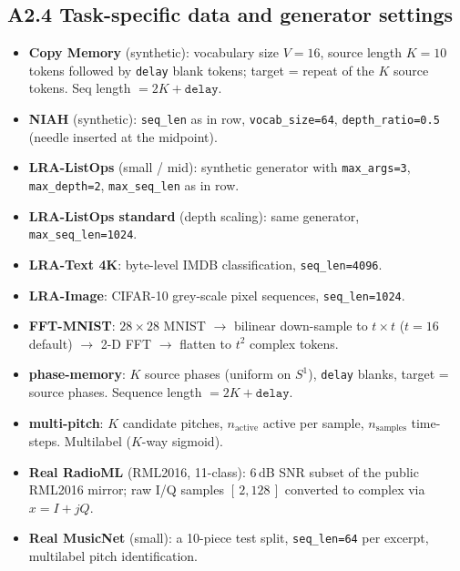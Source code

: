 \documentclass[11pt,a4paper]{article}
\theoremstyle{plain}
\theoremstyle{definition}
\begin{document}
\subsection*{A2.4 Task-specific data and generator settings}
\begin{itemize}
  \item \textbf{Copy Memory} (synthetic): vocabulary size $V = 16$, source length $K = 10$ tokens followed by \texttt{delay} blank tokens; target = repeat of the $K$ source tokens. Seq length $= 2K + \texttt{delay}$.
  \item \textbf{NIAH} (synthetic): \texttt{seq\_len} as in row, \texttt{vocab\_size=64}, \texttt{depth\_ratio=0.5} (needle inserted at the midpoint).
  \item \textbf{LRA-ListOps} (small / mid): synthetic generator with \texttt{max\_args=3}, \texttt{max\_depth=2}, \texttt{max\_seq\_len} as in row.
  \item \textbf{LRA-ListOps standard} (depth scaling): same generator, \texttt{max\_seq\_len=1024}.
  \item \textbf{LRA-Text 4K}: byte-level IMDB classification, \texttt{seq\_len=4096}.
  \item \textbf{LRA-Image}: CIFAR-10 grey-scale pixel sequences, \texttt{seq\_len=1024}.
  \item \textbf{FFT-MNIST}: $28{\times}28$ MNIST $\to$ bilinear down-sample to $t{\times}t$ ($t=16$ default) $\to$ 2-D FFT $\to$ flatten to $t^2$ complex tokens.
  \item \textbf{phase-memory}: $K$ source phases (uniform on $S^1$), \texttt{delay} blanks, target = source phases. Sequence length $= 2K + \texttt{delay}$.
  \item \textbf{multi-pitch}: $K$ candidate pitches, $n_\textrm{active}$ active per sample, $n_\textrm{samples}$ time-steps. Multilabel ($K$-way sigmoid).
  \item \textbf{Real RadioML} (RML2016, 11-class): 6\,dB SNR subset of the public RML2016 mirror; raw I/Q samples $[\,2, 128\,]$ converted to complex via $x = I + jQ$.
  \item \textbf{Real MusicNet} (small): a 10-piece test split, \texttt{seq\_len=64} per excerpt, multilabel pitch identification.
\end{itemize}
\end{document}
